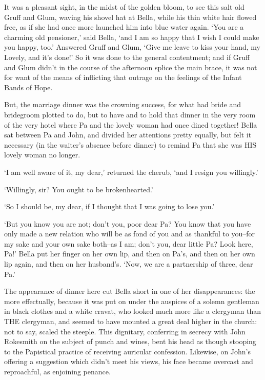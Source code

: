 It was a pleasant sight, in the midst of the golden bloom, to see this
salt old Gruff and Glum, waving his shovel hat at Bella, while his thin
white hair flowed free, as if she had once more launched him into blue
water again. ‘You are a charming old pensioner,’ said Bella, ‘and I am
so happy that I wish I could make you happy, too.’ Answered Gruff and
Glum, ‘Give me leave to kiss your hand, my Lovely, and it’s done!’ So it
was done to the general contentment; and if Gruff and Glum didn’t in the
course of the afternoon splice the main brace, it was not for want of
the means of inflicting that outrage on the feelings of the Infant Bands
of Hope.

But, the marriage dinner was the crowning success, for what had bride
and bridegroom plotted to do, but to have and to hold that dinner in the
very room of the very hotel where Pa and the lovely woman had once dined
together! Bella sat between Pa and John, and divided her attentions
pretty equally, but felt it necessary (in the waiter’s absence before
dinner) to remind Pa that she was HIS lovely woman no longer.

‘I am well aware of it, my dear,’ returned the cherub, ‘and I resign you
willingly.’

‘Willingly, sir? You ought to be brokenhearted.’

‘So I should be, my dear, if I thought that I was going to lose you.’

‘But you know you are not; don’t you, poor dear Pa? You know that you
have only made a new relation who will be as fond of you and as thankful
to you--for my sake and your own sake both--as I am; don’t you, dear
little Pa? Look here, Pa!’ Bella put her finger on her own lip, and then
on Pa’s, and then on her own lip again, and then on her husband’s. ‘Now,
we are a partnership of three, dear Pa.’

The appearance of dinner here cut Bella short in one of her
disappearances: the more effectually, because it was put on under the
auspices of a solemn gentleman in black clothes and a white cravat, who
looked much more like a clergyman than THE clergyman, and seemed to
have mounted a great deal higher in the church: not to say, scaled the
steeple. This dignitary, conferring in secrecy with John Rokesmith on
the subject of punch and wines, bent his head as though stooping to
the Papistical practice of receiving auricular confession. Likewise,
on John’s offering a suggestion which didn’t meet his views, his face
became overcast and reproachful, as enjoining penance.

